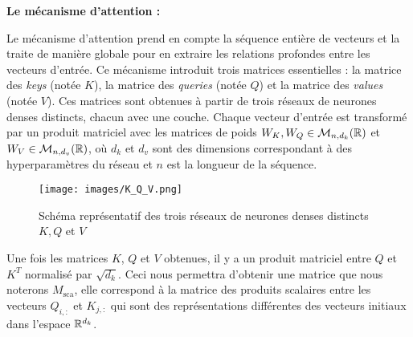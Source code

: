 \documentclass[12pt]{article}
\theoremstyle{definition}
\begin{document}
\textbf{Le mécanisme d'attention :}

Le mécanisme d'attention prend en compte la séquence entière de vecteurs et la traite de manière globale pour en extraire les relations profondes entre les vecteurs d'entrée. Ce mécanisme introduit trois matrices essentielles : la matrice des \textit{keys} (notée \(K\)), la matrice des \textit{queries} (notée \(Q\)) et la matrice des \textit{values} (notée \(V\)). Ces matrices sont obtenues à partir de trois réseaux de neurones denses distincts, chacun avec une couche. Chaque vecteur d'entrée est transformé par un produit matriciel avec les matrices de poids \(W_K, W_Q \in \mathcal{M}_{n,d_k}(\mathbb{R})\) et \(W_V \in \mathcal{M}_{n,d_v}(\mathbb{R})\), où \(d_k\) et \(d_v\) sont des dimensions correspondant à des hyperparamètres du réseau et \(n\) est la longueur de la séquence.



\begin{figure*}[!h]
	\centering
	\texttt{[image: images/K\_Q\_V.png]}
	\caption{Schéma représentatif des trois réseaux de neurones denses distincts $K,Q$ et $V$ }
\end{figure*}



 Une fois les matrices \(K\), \(Q\) et \(V\)  obtenues, il y a un produit matriciel entre \(Q\) et \(K^T\) normalisé par \(\sqrt{d_k}\). Ceci nous permettra d'obtenir une matrice que nous noterons \(M_{\text{sca}}\), elle correspond à la matrice des produits scalaires entre les vecteurs \(Q_{i,:}\) et \(K_{j,:}\) qui sont des représentations différentes des vecteurs initiaux dans l'espace $\mathbb{R}^{d_k}$.
\end{document}
